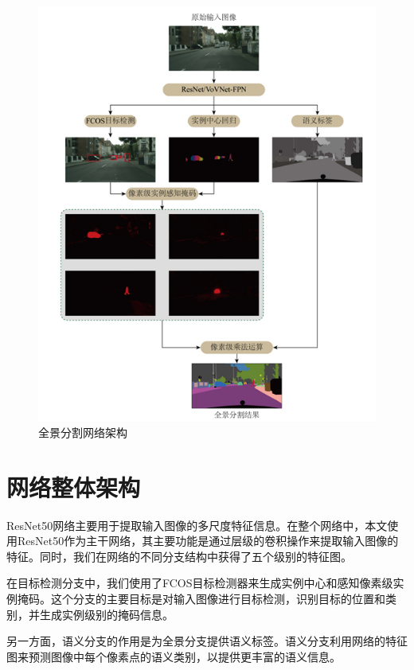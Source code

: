\begin{figure}[!h] %
    \centering %
    \includegraphics[scale=0.8]{fig/chap2/图片1.png} %
    \caption{全景分割网络架构}
    \label{fig1} %
    \end{figure}



\section{网络整体架构}
ResNet50网络主要用于提取输入图像的多尺度特征信息。在整个网络中，本文使用ResNet50作为主干网络，其主要功能是通过层级的卷积操作来提取输入图像的特征。同时，我们在网络的不同分支结构中获得了五个级别的特征图。

在目标检测分支中，我们使用了FCOS目标检测器来生成实例中心和感知像素级实例掩码。这个分支的主要目标是对输入图像进行目标检测，识别目标的位置和类别，并生成实例级别的掩码信息。

另一方面，语义分支的作用是为全景分支提供语义标签。语义分支利用网络的特征图来预测图像中每个像素点的语义类别，以提供更丰富的语义信息。

